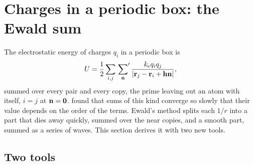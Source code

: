 \section{Charges in a periodic box: the Ewald sum}
\label{sec:md-ewald}

The electrostatic energy of charges $q_i$ in a periodic box is
\begin{equation}
   U = \frac12\sum_{i,j}\sideset{}{'}\sum_{\bm{\mathrm{n}}}
   \frac{k_{\mathrm e}q_iq_j}{\lvert\bm{\mathrm{r}}_j - \bm{\mathrm{r}}_i + \bm{\mathrm{h}}\bm{\mathrm{n}}\rvert} ,
   \label{eq:md-coulomb}
\end{equation}
summed over every pair and every copy, the prime leaving out an atom with
itself, $i = j$ at $\bm{\mathrm{n}} = \bm{\mathrm{0}}$.  found that sums
of this kind converge so slowly that their value depends on the order of
the terms. Ewald's method\cite{Ewald1921} splits each $1/r$ into a part
that dies away quickly, summed over the near copies, and a smooth part,
summed as a series of waves. This section derives it with two new tools.

\subsection*{Two tools}

